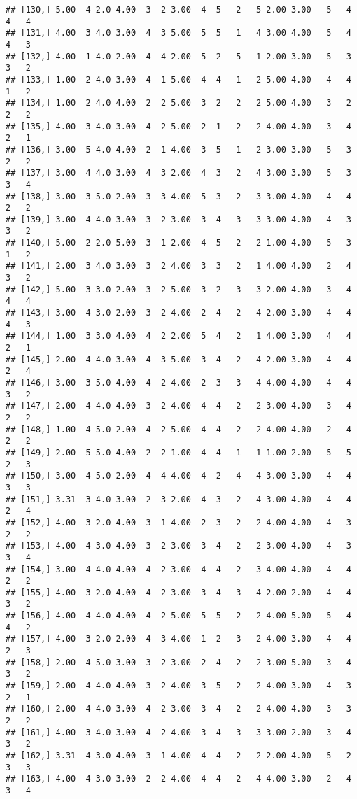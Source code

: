 \documentclass[]{article}
\begin{document}
\begin{verbatim}
## [130,] 5.00  4 2.0 4.00  3  2 3.00  4  5   2   5 2.00 3.00   5   4   4   4
## [131,] 4.00  3 4.0 3.00  4  3 5.00  5  5   1   4 3.00 4.00   5   4   4   3
## [132,] 4.00  1 4.0 2.00  4  4 2.00  5  2   5   1 2.00 3.00   5   3   3   2
## [133,] 1.00  2 4.0 3.00  4  1 5.00  4  4   1   2 5.00 4.00   4   4   1   2
## [134,] 1.00  2 4.0 4.00  2  2 5.00  3  2   2   2 5.00 4.00   3   2   2   2
## [135,] 4.00  3 4.0 3.00  4  2 5.00  2  1   2   2 4.00 4.00   3   4   2   1
## [136,] 3.00  5 4.0 4.00  2  1 4.00  3  5   1   2 3.00 3.00   5   3   2   2
## [137,] 3.00  4 4.0 3.00  4  3 2.00  4  3   2   4 3.00 3.00   5   3   3   4
## [138,] 3.00  3 5.0 2.00  3  3 4.00  5  3   2   3 3.00 4.00   4   4   2   2
## [139,] 3.00  4 4.0 3.00  3  2 3.00  3  4   3   3 3.00 4.00   4   3   3   2
## [140,] 5.00  2 2.0 5.00  3  1 2.00  4  5   2   2 1.00 4.00   5   3   1   2
## [141,] 2.00  3 4.0 3.00  3  2 4.00  3  3   2   1 4.00 4.00   2   4   3   2
## [142,] 5.00  3 3.0 2.00  3  2 5.00  3  2   3   3 2.00 4.00   3   4   4   4
## [143,] 3.00  4 3.0 2.00  3  2 4.00  2  4   2   4 2.00 3.00   4   4   4   3
## [144,] 1.00  3 3.0 4.00  4  2 2.00  5  4   2   1 4.00 3.00   4   4   2   1
## [145,] 2.00  4 4.0 3.00  4  3 5.00  3  4   2   4 2.00 3.00   4   4   2   4
## [146,] 3.00  3 5.0 4.00  4  2 4.00  2  3   3   4 4.00 4.00   4   4   3   2
## [147,] 2.00  4 4.0 4.00  3  2 4.00  4  4   2   2 3.00 4.00   3   4   2   2
## [148,] 1.00  4 5.0 2.00  4  2 5.00  4  4   2   2 4.00 4.00   2   4   2   2
## [149,] 2.00  5 5.0 4.00  2  2 1.00  4  4   1   1 1.00 2.00   5   5   2   3
## [150,] 3.00  4 5.0 2.00  4  4 4.00  4  2   4   4 3.00 3.00   4   4   3   3
## [151,] 3.31  3 4.0 3.00  2  3 2.00  4  3   2   4 3.00 4.00   4   4   2   4
## [152,] 4.00  3 2.0 4.00  3  1 4.00  2  3   2   2 4.00 4.00   4   3   2   2
## [153,] 4.00  4 3.0 4.00  3  2 3.00  3  4   2   2 3.00 4.00   4   3   3   4
## [154,] 3.00  4 4.0 4.00  4  2 3.00  4  4   2   3 4.00 4.00   4   4   2   2
## [155,] 4.00  3 2.0 4.00  4  2 3.00  3  4   3   4 2.00 2.00   4   4   3   2
## [156,] 4.00  4 4.0 4.00  4  2 5.00  5  5   2   2 4.00 5.00   5   4   4   2
## [157,] 4.00  3 2.0 2.00  4  3 4.00  1  2   3   2 4.00 3.00   4   4   2   3
## [158,] 2.00  4 5.0 3.00  3  2 3.00  2  4   2   2 3.00 5.00   3   4   3   2
## [159,] 2.00  4 4.0 4.00  3  2 4.00  3  5   2   2 4.00 3.00   4   3   2   1
## [160,] 2.00  4 4.0 3.00  4  2 3.00  3  4   2   2 4.00 4.00   3   3   2   2
## [161,] 4.00  3 4.0 3.00  4  2 4.00  3  4   3   3 3.00 2.00   3   4   3   2
## [162,] 3.31  4 3.0 4.00  3  1 4.00  4  4   2   2 2.00 4.00   5   2   3   3
## [163,] 4.00  4 3.0 3.00  2  2 4.00  4  4   2   4 4.00 3.00   2   4   3   4

\end{verbatim}
\end{document}

